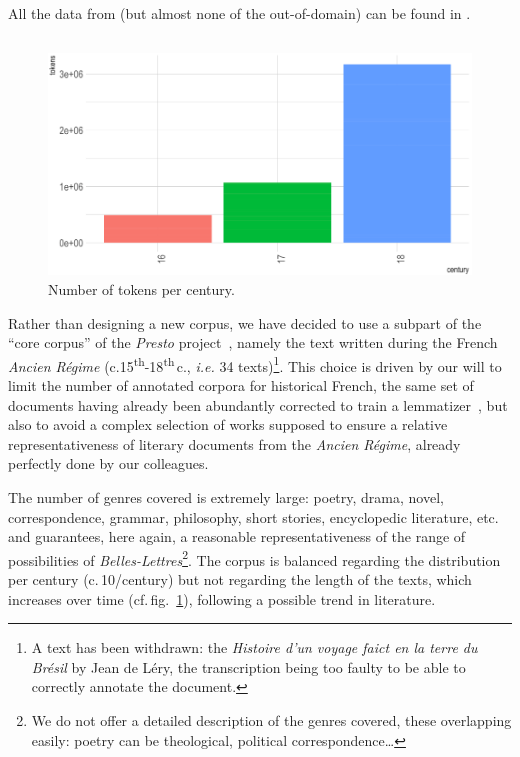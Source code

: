 All the data from \freemlpm (but almost none of the out-of-domain) can be found in \freemmax.

\subsection{\texorpdfstring{\freemner}{FREEM NER}}\label{freem_ner}

\begin{figure}[!htp]
    \centering
    \includegraphics[width=0.6\linewidth]{static/media/mod_eval/dalembert/distribution_tokens_corpus.png}
    \caption{Number of tokens per century.}
    \label{fig:description}
\end{figure}

Rather than designing a new corpus, we have decided to use a subpart of the ``core corpus'' of the \textit{Presto} project~\citep{blumenthal-etal-2017-presto}, namely the text written during the French \textit{Ancien Régime} (c.15\textsuperscript{th}-18\textsuperscript{th}\,c., \textit{i.e.} 34 texts)\footnote{A text has been withdrawn: the \textit{Histoire d'un voyage faict en la terre du Brésil} by Jean de Léry, the transcription being too faulty to be able to correctly annotate the document.}. This choice is driven by our will to limit the number of annotated corpora for historical French, the same set of documents having already been abundantly corrected to train a lemmatizer~\citep{gabay-etal-2020-standardizing}, but also to avoid a complex selection of works supposed to ensure a relative representativeness of literary documents from the \textit{Ancien Régime}, already perfectly done by our colleagues.

The number of genres covered is extremely large: poetry, drama, novel, correspondence, grammar, philosophy, short stories, encyclopedic literature, etc. and guarantees, here again, a reasonable representativeness of the range of possibilities of \textit{Belles-Lettres}\footnote{We do not offer a detailed description of the genres covered, these overlapping easily: poetry can be theological, political correspondence\dots}. The corpus is balanced regarding the distribution per century (c.\,10/century) but not regarding the length of the texts, which increases over time (cf.\,fig.~\ref{fig:description}), following a possible trend in literature.

